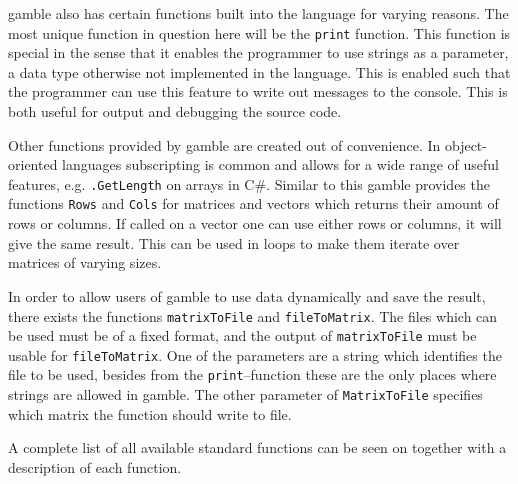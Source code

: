 \gls{gamble} also has certain functions built into the language for varying reasons.
The most unique function in question here will be the \texttt{print} function.
This function is special in the sense that it enables the programmer to use strings as a parameter, a data type otherwise not implemented in the language.
This is enabled such that the programmer can use this feature to write out messages to the console. 
This is both useful for output and debugging the source code.

Other functions provided by \gls{gamble} are created out of convenience.
In object-oriented languages subscripting is common and allows for a wide range of useful features, e.g. \texttt{.GetLength} on arrays in C\#.
Similar to this \gls{gamble} provides the functions \texttt{Rows} and \texttt{Cols} for matrices and vectors which returns their amount of rows or columns.
If called on a vector one can use either rows or columns, it will give the same result.
This can be used in loops to make them iterate over matrices of varying sizes.


In order to allow users of \gls{gamble} to use data dynamically and save the result, there exists the functions \texttt{matrixToFile} and  \texttt{fileToMatrix}. 
The files which can be used must be of a fixed format, and the output of \texttt{matrixToFile} must be usable for \texttt{fileToMatrix}.
One of the parameters are a string which identifies the file to be used, besides from the \texttt{print}--function these are the only places where strings are allowed in \gls{gamble}.
The other parameter of \texttt{MatrixToFile} specifies which matrix the function should write to file.

A complete list of all available standard functions can be seen on  together with a description of each function.


